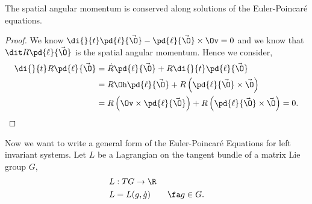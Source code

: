 \begin{nthm}[]
  The spatial angular momentum is conserved along solutions of the Euler-Poincar\'e equations.
\end{nthm}
\begin{proof}
  We know $\di {}{t}\pd{\ell}{\vec \O} - \pd{\ell}{\vec \O} \times \Ov = 0$ and we know that $\dit R\pd{\ell}{\vec\O}$ is the spatial angular momentum. Hence we consider,
  \begin{align*}
    \di{}{t} R\pd{\ell}{\vec \O} &= \dot R \pd{\ell}{\vec \O} + R\di { }{t} \pd{\ell}{\vec\O}\\
    &= R\Oh\pd{\ell}{\vec\O} + R\left(\pd{\ell}{\vec \O} \times \vec\O\right)\\
    &= R\left(\Ov \times \pd{\ell}{\vec\O}\right) + R\left(\pd{\ell}{\vec \O} \times \vec\O\right) = 0.
\end{align*}
\end{proof}

\noindent
Now we want to write a general form of the Euler-Poincar\'e Equations for left invariant systems. Let $L$ be a Lagrangian on the tangent bundle of a matrix Lie group $G$,
\begin{align*}
  &L : TG \to \R\\
  &L = L(g, \dot g) \qquad \fa g \in G.
\end{align*}

